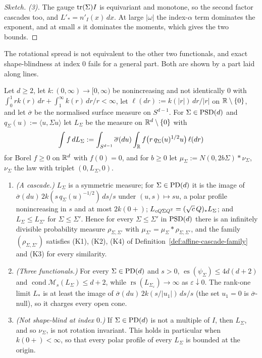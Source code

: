 \begin{proof}[Sketch]
\emph{(3).} The gauge $\operatorname{tr}(\Sigma)I$ is equivariant and monotone, so the second factor cascades too, and
$L'_* = n'_I(x)\,dx$. At large $|\omega|$ the index-$\alpha$ term dominates the exponent, and at small $s$ it
dominates the moments, which gives the two bounds.
\end{proof}

The rotational spread is not equivalent to the other two functionals, and exact shape-blindness at index
$0$ fails for a general part. Both are shown by a part laid along lines.

\begin{proposition}\label{prop:similarity-line-family}
Let $d \ge 2$, let $k : (0,\infty) \to [0,\infty)$ be nonincreasing and not identically $0$ with
$\int_0^1rk(r)\,dr + \int_1^\infty k(r)\,dr/r < \infty$, let $\ell(dr) := k(|r|)\,dr/|r|$ on
$\mathbb{R} \setminus \{0\}$, and let $\overline\sigma$ be the normalised surface measure on $S^{d-1}$. For
$\Sigma \in \mathrm{PSD}(d)$ and $q_\Sigma(u) := \langle u,\Sigma u\rangle$ let $L_\Sigma$ be the measure on
$\mathbb{R}^d \setminus \{0\}$ with
\[
  \int f\,dL_\Sigma := \int_{S^{d-1}}\overline\sigma(du)\int_{\mathbb{R}}f\bigl(r\,q_\Sigma(u)^{1/2}u\bigr)\,\ell(dr)
\]
for Borel $f \ge 0$ on $\mathbb{R}^d$ with $f(0) = 0$, and for $b \ge 0$ let $\mu_\Sigma := N(0,2b\Sigma) * \nu_\Sigma$,
$\nu_\Sigma$ the law with triplet $(0, L_\Sigma, 0)$.
\begin{enumerate}
\item \emph{(A cascade.)} $L_\Sigma$ is a symmetric \Levy{} measure; for $\Sigma \in \mathrm{PD}(d)$ it is the image
of $\overline\sigma(du)\,2k(s\,q_\Sigma(u)^{-1/2})\,ds/s$ under $(u,s) \mapsto su$, a polar profile nonincreasing in
$s$ and at most $2k(0{+})$; $L_{cQ\Sigma Q^{\mathsf{T}}} = (\sqrt c\,Q)_*L_\Sigma$; and $L_\Sigma \le L_{\Sigma'}$ for
$\Sigma \le \Sigma'$. Hence for every $\Sigma \le \Sigma'$ in $\mathrm{PSD}(d)$ there is an infinitely divisible
probability measure $\rho_{\Sigma,\Sigma'}$ with $\mu_{\Sigma'} = \mu_\Sigma * \rho_{\Sigma,\Sigma'}$, and the family
$(\rho_{\Sigma,\Sigma'})$ satisfies (K1), (K2), (K4) of Definition~\ref{def:affine-cascade-family} and (K3) for every
similarity.
\item \emph{(Three functionals.)} For every $\Sigma \in \mathrm{PD}(d)$ and $s > 0$,
$\operatorname{es}(\psi_\Sigma) \le 4d(d+2)$ and $\operatorname{cond}\mathcal M_s(L_\Sigma) \le d+2$, while
$\operatorname{rs}(L_{\Sigma_\varepsilon}) \to \infty$ as $\varepsilon \downarrow 0$. The rank-one limit $L_*$ is at least the
image of $\overline\sigma(du)\,2k(s/|u_1|)\,ds/s$ (the set $u_1 = 0$ is $\overline\sigma$-null), so it
charges every open cone.
\item \emph{(Not shape-blind at index $0$.)} If $\Sigma \in \mathrm{PD}(d)$ is not a multiple of $I$, then $L_\Sigma$,
and so $\nu_\Sigma$, is not rotation invariant. This holds in particular when $k(0{+}) < \infty$, so that
every polar profile of every $L_\Sigma$ is bounded at the origin.
\end{enumerate}
\end{proposition}

